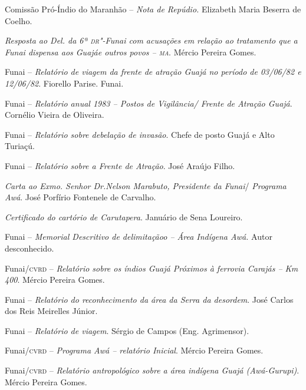\begin{itemize}
{\item[1982] Comissão Pró-Índio do Maranhão -- \emph{Nota de Repúdio.}
Elizabeth Maria Beserra de Coelho.

\item[1982] \emph{Resposta ao Del. da 6ª \textsc{dr}"-Funai com acusações em
relação ao tratamento que a Funai dispensa aos Guajáe outros povos --
\textsc{ma}}. Mércio Pereira Gomes.

\item[1983] Funai -- \emph{Relatório de viagem da frente de atração
Guajá no período de 03/06/82 e 12/06/82}. Fiorello Parise. Funai.

\item[1983] Funai -- \emph{Relatório anual 1983 -- Postos de
Vigilância/ Frente de Atração Guajá}. Cornélio Vieira de Oliveira.

\item[1984] Funai -- \emph{Relatório sobre debelação de invasão}.
Chefe de posto Guajá e Alto Turiaçú.

\item[1984] Funai -- \emph{Relatório sobre a Frente de Atração}. José
Araújo Filho.

\item[1984] \emph{Carta ao Exmo. Senhor Dr.Nelson Marabuto,
Presidente da Funai}/ \emph{Programa Awá}. José Porfírio Fontenele de
Carvalho.

\item[1985] \emph{Certificado do cartório de Carutapera}. Januário de
Sena Loureiro.

\item[1985] Funai -- \emph{Memorial Descritivo de delimitaçãoo --
Área Indígena Awá.} Autor desconhecido.

\item[1985] Funai/\textsc{cvrd} -- \emph{Relatório sobre os índios Guajá
Próximos à ferrovia Carajás -- Km 400}. Mércio Pereira Gomes.

\item[1985] Funai -- \emph{Relatório do reconhecimento da área da
Serra da desordem}. José Carlos dos Reis Meirelles Júnior.

\item[1985] Funai -- \emph{Relatório de viagem}. Sérgio de Campos
(Eng. Agrimensor).

\item[1985] Funai/\textsc{cvrd} -- \emph{Programa Awá -- relatório Inicial}.
Mércio Pereira Gomes.

\item[1985] Funai/\textsc{cvrd} -- \emph{Relatório antropológico sobre a área
indígena Guajá (Awá-Gurupi)}. Mércio Pereira Gomes.

}
\end{itemize}
